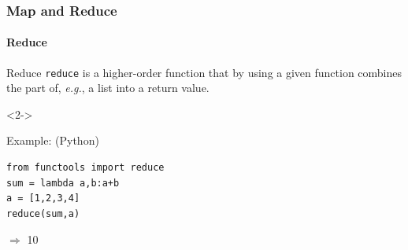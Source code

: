 \documentclass[aspectratio=169,usenames,dvipsnames]{beamer}
\begin{document}
    \begin{frame}[fragile]
        \frametitle{Map and Reduce}
        \framesubtitle{Reduce}

            \begin{block}{Reduce}
                \texttt{reduce} is a higher-order function that by using a
                given function combines the part of, \textit{e.g.}, a list into
                a return value.
            \end{block}
            \begin{uncoverenv}<2->
            \begin{block}{Example: \hfill \small(Python)}
            \begin{center}
            \begin{minipage}{0.8\linewidth}
            \begin{lstlisting}
from functools import reduce
sum = lambda a,b:a+b
a = [1,2,3,4]
reduce(sum,a)
            \end{lstlisting}
            $\Rightarrow$ 10
            \end{minipage}
            \end{center}
            \end{block}
            \end{uncoverenv}
    \end{frame}
\end{document}
